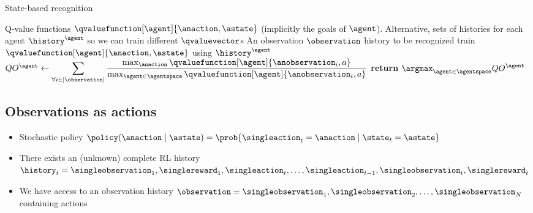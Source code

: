 \begin{algorithm}[H]
    \caption{State-based recognition}
    \label{alg:state-recognition}
\begin{algorithmic}
    \Require Q-value functions $\qvaluefunction[\agent]{\anaction, \astate}$ (implicitly the goals of $\agent$). 
    \Require Alternative, sets of histories for each agent $\history^{\agent}$ so we can train different $\qvaluevector$s
    \Require An observation $\observation$ history to be recognized
    \State train $\qvaluefunction[\agent]{\anaction, \astate}$ using $\history^{\agent}$
    \ForAll{$\agent \in \agentspace$}
        \State $QO^{\agent} \gets \displaystyle\sum_{\forall{i} \in |\observation|}\frac{\max_{\anaction}\qvaluefunction[\agent]{\anobservation_{i},a}}{\max_{\agent \in \agentspace}\qvaluefunction[\agent]{\anobservation_{i},a}}$ 
    \EndFor
    \State \textbf{return} $\displaystyle\argmax_{\agent \in \agentspace}QO^{\agent}$
    \EndFunction
\end{algorithmic}
\end{algorithm}

\subsection{Observations as actions}

\begin{itemize}
    \item Stochastic policy $\policy(\anaction \mid \astate) = \prob{\singleaction_{t} = \anaction \mid \state_{t} = \astate}$
    \item There exists an (unknown) complete RL history $\history_{t} = \singleobservation_{1}, \singlereward_{1}, \singleaction_{t}, \dots, \singleaction_{t-1}, \singleobservation_{t},\singlereward_{t}$
    \item We have access to an observation history $\observation = \singleobservation_{1}, \singleobservation_{2}, \dots, \singleobservation_{N}$ containing actions
\end{itemize}

